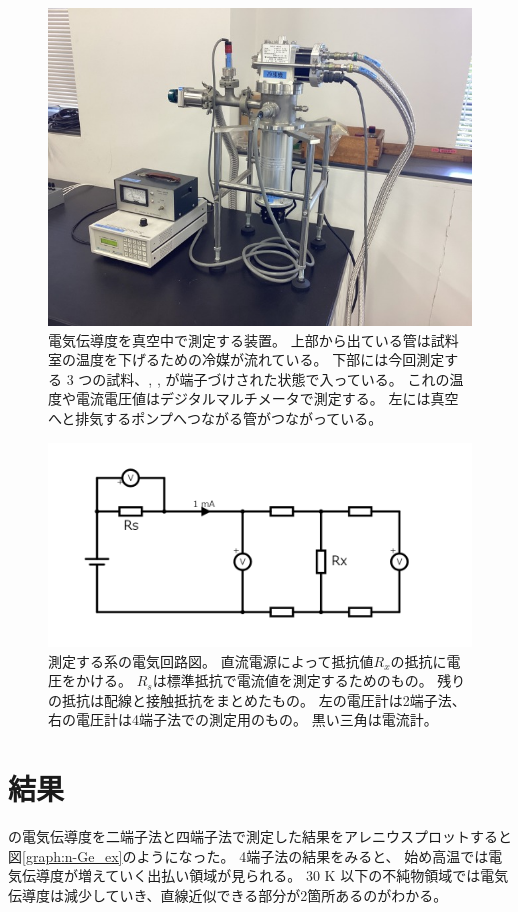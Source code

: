 \documentclass[11pt,dvipdfmx,a4paper]{jsarticle}
\begin{document}
\begin{figure}[h]
	\centering
	\includegraphics[width=0.5\columnwidth]{pic/01.jpg}
	\caption{
		電気伝導度を真空中で測定する装置。
		上部から出ている管は試料室の温度を下げるための冷媒が流れている。
		下部には今回測定する 3 つの試料、, ,  が端子づけされた状態で入っている。
        これの温度や電流電圧値はデジタルマルチメータで測定する。
		左には真空へと排気するポンプへつながる管がつながっている。
	}
	\label{pic:measure_system}
\end{figure}
\begin{figure}[h]
	\centering
	\includegraphics[width=0.75\columnwidth]{fig/fig4.png}
	\caption{測定する系の電気回路図。
    直流電源によって抵抗値\(R_x\)の抵抗に電圧をかける。
    \(R_s\)は標準抵抗で電流値を測定するためのもの。
    残りの抵抗は配線と接触抵抗をまとめたもの。
    左の電圧計は2端子法、右の電圧計は4端子法での測定用のもの。
    黒い三角は電流計。
	}
	\label{fig:circuit_system}
\end{figure}

\clearpage
\section{結果}
 の電気伝導度を二端子法と四端子法で測定した結果をアレニウスプロットすると図\ref{graph:n-Ge_ex}のようになった。
4端子法の結果をみると、
始め高温では電気伝導度が増えていく出払い領域が見られる。
30 K 以下の不純物領域では電気伝導度は減少していき、直線近似できる部分が2箇所あるのがわかる。
\end{document}
